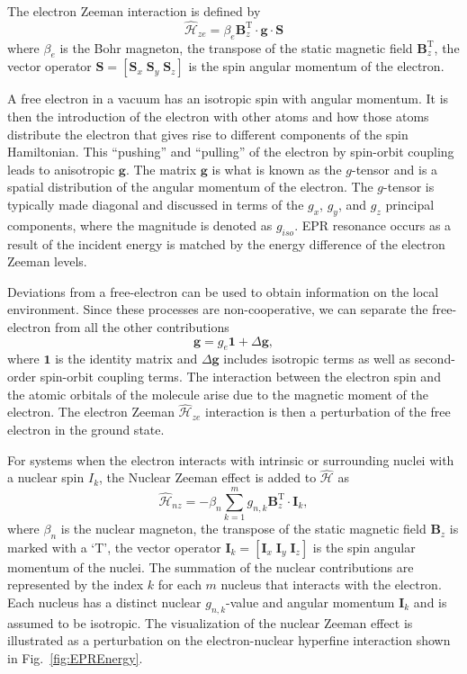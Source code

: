 The electron Zeeman interaction is defined by
\begin{equation*}
    \hat{\mathcal{H}}_{ze} = \beta_e \mathbf{B}^\text{T}_z  \cdot \mathbf{g} \cdot \mathbf{S}
\end{equation*}
where $\beta_e$ is the Bohr magneton, the transpose of the static magnetic field $\mathbf{B}_z^{\text{T}}$, the vector operator $\mathbf{S} = [\mathbf{S}_x \; \mathbf{S}_y \; \mathbf{S}_z]$ is the spin angular momentum of the electron. 

A free electron in a vacuum has an isotropic spin with angular momentum. It is then the introduction of the electron with other atoms and how those atoms distribute the electron that gives rise to different components of the spin Hamiltonian.\cite{abragam2012electron,harriman1978theoretical} This ``pushing'' and ``pulling'' of the electron by spin-orbit coupling leads to anisotropic $\mathbf{g}$. The matrix $\mathbf{g}$ is what is known as the $g$-tensor and is a spatial distribution of the angular momentum of the electron. The $g$-tensor is typically made diagonal and discussed in terms of the $g_x$, $g_y$, and $g_z$ principal components, where the magnitude is denoted as $g_{iso}$. EPR resonance occurs as a result of the incident energy is matched by the energy difference of the electron Zeeman levels. 

Deviations from a free-electron can be used to obtain information on the local environment. Since these processes are non-cooperative, we can separate the free-electron from all the other contributions
\begin{equation*}
    \mathbf{g} = g_e \mathbf{1} + \Delta \mathbf{g},
\end{equation*}
where $\mathbf{1}$ is the identity matrix and $\Delta \mathbf{g}$ includes isotropic terms as well as second-order spin-orbit coupling terms. The interaction between the electron spin and the atomic orbitals of the molecule arise due to the magnetic moment of the electron. \cite{griffith1964theory} The electron Zeeman $\hat{\mathcal{H}}_{ze}$ interaction is then a perturbation of the free electron in the ground state. 

For systems when the electron interacts with intrinsic or surrounding nuclei with a nuclear spin $I_k$, the Nuclear Zeeman effect is added to $\hat{\mathcal{H}}$ as
\begin{equation*}
    \hat{\mathcal{H}}_{nz} = - \beta_n \sum_{k=1}^m g_{n,k} \mathbf{B}^\text{T}_z  \cdot \mathbf{I}_k,
\end{equation*}
where $\beta_n$ is the nuclear magneton, the transpose of the static magnetic field $\mathbf{B}_z$ is marked with a `T', the vector operator $\mathbf{I}_k = [\mathbf{I}_x \; \mathbf{I}_y \; \mathbf{I}_z]$ is the spin angular momentum of the nuclei. The summation of the nuclear contributions are represented by the index $k$ for each $m$ nucleus that interacts with the electron. Each nucleus has a distinct nuclear $g_{n,k}$-value and angular momentum $\mathbf{I}_k$ and is assumed to be isotropic. The visualization of the nuclear Zeeman effect is illustrated as a perturbation on the electron-nuclear hyperfine interaction shown in Fig.~\ref{fig:EPREnergy}.

